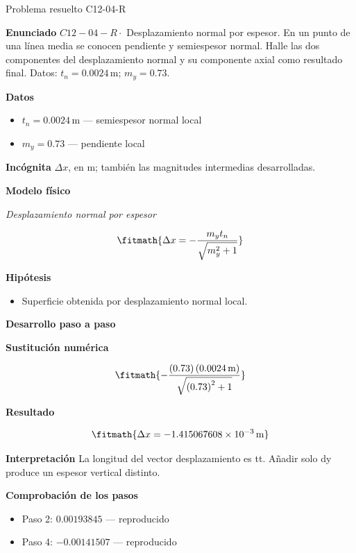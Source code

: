 \documentclass[10pt,openany]{book}
\begin{document}
\begin{studiumworked}{Problema resuelto C12-04-R}


\noindent\textbf{Enunciado}
\(C12-04-R \cdot\) Desplazamiento normal por espesor. En un punto de una línea media se conocen pendiente y semiespesor normal. Halle las dos componentes del desplazamiento normal y su componente axial como resultado final. Datos: \(t_n=0.0024\, \mathrm{m}\); \(m_y=0.73\).

\noindent\textbf{Datos}
\begin{itemize}
\item $t_n = 0.0024\,\mathrm{m}$ — semiespesor normal local
\item $m_y = 0.73$ — pendiente local
\end{itemize}

\noindent\textbf{Incógnita}
$\Delta x$, en $\mathrm{m}$; también las magnitudes intermedias desarrolladas.

\noindent\textbf{Modelo físico}

\noindent\textit{Desplazamiento normal por espesor}

\[
\fitmath{\Delta x=- \frac{m_y t_n}{\sqrt{m_y^{2} + 1}}}
\]

\noindent\textbf{Hipótesis}
\begin{itemize}
\item Superficie obtenida por desplazamiento normal local.
\end{itemize}

\noindent\textbf{Desarrollo paso a paso}



\noindent\textbf{Sustitución numérica}

\[
\fitmath{- \frac{\left(0.73\right) \left(0.0024\,\mathrm{m}\right)}{\sqrt{\left(0.73\right)^{2} + 1}}}
\]

\noindent\textbf{Resultado}

\[
\fitmath{\Delta x=-1.415067608\times10^{-3}\,\mathrm{m}}
\]

\noindent\textbf{Interpretación}
La longitud del vector desplazamiento es tt. Añadir solo dy produce un espesor vertical distinto.

\noindent\textbf{Comprobación de los pasos}
\begin{itemize}
\item Paso 2: $0.00193845$ — reproducido
\item Paso 4: $-0.00141507$ — reproducido
\end{itemize}


\end{studiumworked}
\end{document}
